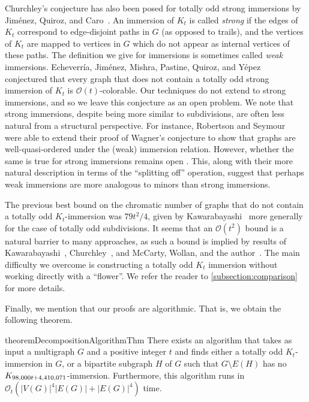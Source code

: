 \documentclass{article}
\theoremstyle{definition}
\begin{document}
Churchley's conjecture has also been posed for totally odd strong immersions by Jim\'{e}nez, Quiroz, and Caro~\cite{Jimenez2024totally}. An immersion of $K_t$ is called \emph{strong} if the edges of $K_t$ correspond to edge-disjoint paths in $G$ (as opposed to trails), and the vertices of $K_t$ are mapped to vertices in $G$ which do not appear as internal vertices of these paths. The definition we give for immersions is sometimes called \emph{weak} immersions. Echeverr\'{i}a, Jim\'{e}nez, Mishra, Pastine, Quiroz, and Y\'{e}pez~\cite{echeverria2025topological} conjectured that every graph that does not contain a totally odd strong immersion of $K_t$ is $\mathcal{O}(t)$-colorable. Our techniques do not extend to strong immersions, and so we leave this conjecture as an open problem. We note that strong immersions, despite being more similar to subdivisions, are often less natural from a structural perspective. For instance, Robertson and Seymour~\cite{robertson2010graph} were able to extend their proof of Wagner's conjecture to show that graphs are well-quasi-ordered under the (weak) immersion relation. However, whether the same is true for strong immersions remains open \cite{liu2020recent, liu2023well}. This, along with their more natural description in terms of the ``splitting off'' operation, suggest that perhaps weak immersions are more analogous to minors than strong immersions.

The previous best bound on the chromatic number of graphs that do not contain a totally odd $K_t$-immersion was $79t^2/4$, given by Kawarabayashi~\cite{Kawarabayashi2013Totally} more generally for the case of totally odd subdivisions. It seems that an $\mathcal{O}(t^2)$ bound is a natural barrier to many approaches, as such a bound is implied by results of Kawarabayashi~\cite{Kawarabayashi2013Totally}, Churchley~\cite{Churchley2017Odd}, and McCarty, Wollan, and the author~\cite{McCartyMW2026Structure}. The main difficulty we overcome is constructing a totally odd $K_t$ immersion without working directly with a ``flower''. We refer the reader to \cref{subsection:comparison} for more details.

Finally, we mention that our proofs are algorithmic. That is, we obtain the following theorem.

 \begin{restatable}{theorem}{DecompositionAlgorithmThm}\label{thm:DecompositionAlgorithm}
     There exists an algorithm that takes as input a multigraph $G$ and a positive integer $t$ and finds either a totally odd $K_t$-immersion in $G$, or a bipartite subgraph $H$ of $G$ such that $G \setminus E(H)$ has no $K_{98{\small,}000t + 4{\small,}410{\small,}071}$-immersion. Furthermore, this algorithm runs in $\mathcal{O}_t(|V(G)|^4|E(G)| + |E(G)|^4)$ time.
 \end{restatable}
\end{document}
